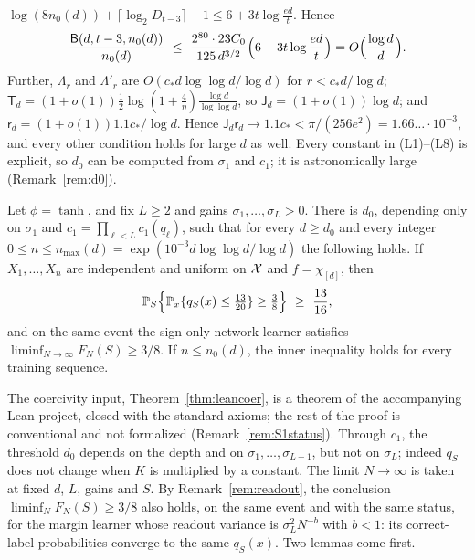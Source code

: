 $\log(8n_0(d))+\lceil\log_2D_{t-3}\rceil+1\le6+3t\log\frac{ed}t$. Hence
\[
 \frac{\mathsf B(d,t-3,n_0(d))}{n_0(d)}\ \le\
 \frac{2^{80}\cdot23C_0}{125\,d^{3/2}}\Bigl(6+3t\log\frac{ed}t\Bigr)
 =O\Bigl(\frac{\log d}d\Bigr).
\]
Further, $\Lambda_r$ and $\Lambda'_r$ are $O(c_*d\log\log d/\log d)$ for
$r<c_*d/\log d$; $\mathsf T_d=(1+o(1))\frac12\log(1+\frac4\eta)
\frac{\log d}{\log\log d}$, so $\mathsf J_d=(1+o(1))\log d$; and
$\mathsf r_d=(1+o(1))1.1c_*/\log d$. Hence
$\mathsf J_d\mathsf r_d\to1.1c_*<\pi/(256e^2)=1.66\ldots\cdot10^{-3}$, and
every other condition holds for large $d$ as well. Every constant in
(L1)--(L8) is explicit, so $d_0$ can be computed from $\sigma_1$ and $c_1$;
it is astronomically large (Remark~\ref{rem:d0}).

\begin{theorem}\label{thm:S1}
Let $\phi=\tanh$, and fix $L\ge2$ and gains $\sigma_1,\ldots,\sigma_L>0$.
There is $d_0$, depending only on $\sigma_1$ and
$c_1=\prod_{\ell<L}c_1(q_\ell)$, such that for every
$d\ge d_0$ and every integer $0\le n\le n_{\max}(d)
=\exp(10^{-3}d\log\log d/\log d)$ the following holds. If
$X_1,\ldots,X_n$ are independent and uniform on $\mathcal X$ and $f=\chi_{[d]}$,
then
\[
 \Pp_S\Bigl\{\Pp_x\{q_S(x)\le\tfrac{13}{20}\}\ge\tfrac38\Bigr\}\ \ge\
 \frac{13}{16} ,
\]
and on the same event the sign-only network learner satisfies
$\liminf_{N\to\infty}F_N(S)\ge3/8$. If $n\le n_0(d)$, the inner inequality
holds for every training sequence.
\end{theorem}
The coercivity input, Theorem~\ref{thm:leancoer}, is a theorem of the
accompanying Lean project, closed with the standard
axioms; the rest of the proof is conventional and not formalized
(Remark~\ref{rem:S1status}). Through $c_1$, the threshold $d_0$ depends on
the depth and on $\sigma_1,\ldots,\sigma_{L-1}$, but not on $\sigma_L$;
indeed $q_S$ does not change when $K$ is multiplied by a constant. The
limit $N\to\infty$ is taken at fixed $d$, $L$, gains and $S$. By
Remark~\ref{rem:readout}, the conclusion $\liminf_NF_N(S)\ge3/8$ also
holds, on the same event and with the same status, for the margin learner
whose readout variance is $\sigma_L^2N^{-b}$ with $b<1$: its correct-label
probabilities converge to the same $q_S(x)$. Two lemmas come first.

